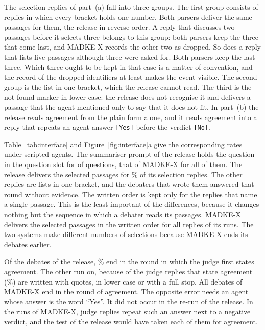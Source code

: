 The selection replies of part~(a) fall into three groups. The first group consists of replies in which every bracket holds one number. Both parsers deliver the same passages for them, the release in reverse order. A reply that discusses two passages before it selects three belongs to this group: both parsers keep the three that come last, and MADKE-X records the other two as dropped. So does a reply that lists five passages although three were asked for. Both parsers keep the last three. Which three ought to be kept in that case is a matter of convention, and the record of the dropped identifiers at least makes the event visible. The second group is the list in one bracket, which the release cannot read. The third is the not-found marker in lower case: the release does not recognise it and delivers a passage that the agent mentioned only to say that it does not fit. In part~(b) the release reads agreement from the plain form alone, and it reads agreement into a reply that repeats an agent answer \texttt{[Yes]} before the verdict \texttt{[No]}.

Table~\ref{tab:interface} and Figure~\ref{fig:interface}a give the corresponding rates under scripted agents. The summariser prompt of the release holds the question in the question slot for \VBindRel{} of \VNQuestions{} questions, that of MADKE-X for all of them. The release delivers the selected passages for \VSetPctRel\% of its \VSelRel{} selection replies. The other \VSetBadRel{} replies are lists in one bracket, and the debaters that wrote them answered that round without evidence. The written order is kept only for the \VOrderOkRel{} replies that name a single passage. This is the least important of the differences, because it changes nothing but the sequence in which a debater reads its passages. MADKE-X delivers the selected passages in the written order for all \VSelX{} replies of its runs. The two systems make different numbers of selections because MADKE-X ends its debates earlier.

Of the debates of the release, \VStopPctRel\% end in the round in which the judge first states agreement. The other \VStopLateRel{} run on, because \VMissedRel{} of the \VJudgeYesRel{} judge replies that state agreement (\VMissedPctRel\%) are written with quotes, in lower case or with a full stop. All debates of MADKE-X end in the round of agreement. The opposite error needs an agent whose answer is the word ``Yes''. It did not occur in the re-run of the release. In the runs of MADKE-X, \VFalseAgreeX{} judge replies repeat such an answer next to a negative verdict, and the test of the release would have taken each of them for agreement.

